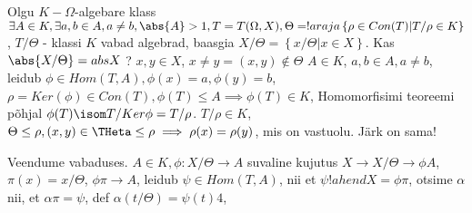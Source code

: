 \documentclass[12pt]{report}
\numberwithin{equation}{section}
\theoremstyle{definition}
\theoremstyle{plain}
\begin{document}
Olgu $K - \Omega$-algebare klass
$\exists A \in K, \exists a,b \in A, a \neq b, \abs{A} > 1, T = T(\Omega,X), \Theta = !araja \left\lbrace \rho \in Con(T) | T/ \rho \in K \right\rbrace$, $T / \Theta $ - klassi $K$ vabad algebrad, baasgia $X / \Theta = \left\lbrace x / \Theta | x \in X \right\rbrace$. Kas $\abs{X / \Theta} = abs{X}$ ? $x,y \in X$, $x \neq y = (x,y) \not \in \Theta$
$A \in K$, $a,b \in A, a \neq b$, leidub $\phi \in Hom(T,A), \phi(x) = a, \phi(y) = b$, $\rho = Ker(\phi) \in Con(T), \phi(T) \leq A \implies \phi(T) \in K$, Homomorfisimi teoreemi põhjal $\phi(T) \isom T/Ker \phi = T / \rho$. $T/ \rho \in K$, $\Theta \leq \rho, (x,y) \in \THeta \leq \rho \implies \rho(x) = \rho(y)$, mis on vastuolu. Järk on sama!

Veendume vabaduses. $A \in K, \phi: X/ \Theta \to A$ suvaline kujutus $X \to X/ \Theta \to \phi A$, $\pi(x) = x/ \Theta$, $\phi \pi \to A$, leidub $\psi \in Hom(T,A)$, nii et $\psi !ahend X = \phi \pi$, otsime $\alpha$ nii, et $\alpha \pi = \psi$, def $\alpha(t/ \Theta) = \psi(t)4$,  
\end{document}
